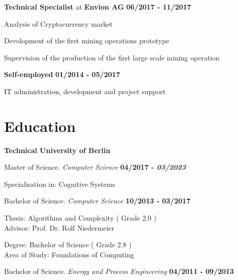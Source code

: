 \documentclass[11pt]{thyv}
\begin{document}
\begin{mdframed}
			\bigskip
			\textbf{Technical Specialist} at \textbf{Envion AG} 						\hfill \textbf{06/2017 - 11/2017}
			    \begin{loneinnerlist}
			    	\item Analysis of Cryptocurrency market
			    	\item Devolopment of the first mining operations prototype
			    	\item Supervision of the production of the first large scale mining operation
			    \end{loneinnerlist}

			\bigskip
			\textbf{Self-employed} 														\hfill \textbf{01/2014 - 05/2017}
			    \begin{loneinnerlist}
			    	\item IT administration, development and project support
			    \end{loneinnerlist}

		\section{Education}

			\textbf{Technical University of Berlin}

			\begin{outerlist}
				\item[] Master of Science. \textit{Computer Science} 					\hfill \textbf{04/2017 - \textit{03/2023}}
				        \begin{innerlist}
				        	\item Specialisation in: Cognitive Systems
				        \end{innerlist}

				\item[] Bachelor of Science. \textit{Computer Science} 					\hfill \textbf{10/2013 - 03/2017}
				        \begin{innerlist}
				        \item Thesis: Algorithms and Complexity 						\hfill ( Grade 2.0 ) \\
				        Advisor: Prof. Dr. Rolf Niedermeier
				        \item Degree: Bachelor of Science 								\hfill ( Grade 2.8 ) \\
				        Area of Study: Foundations of Computing
				        \end{innerlist}

				\item[] Bachelor of Science. \textit{Energy and Process Engineering} 	\hfill \textbf{04/2011 - 09/2013}
			\end{outerlist}


\end{mdframed}
\end{document}
